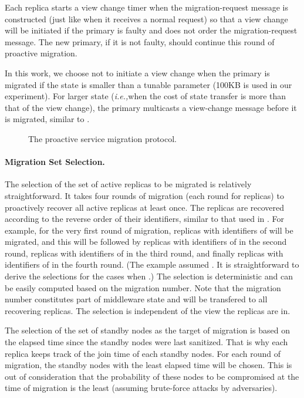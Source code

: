 \documentclass[times, 10pt, twocolumn]{article}
\newcommand{\ie}{{\it i.e.,}}
\begin{document}
Each replica starts a view change timer when the {\sc migration-request}
message is constructed (just like when it receives a normal request) so 
that a view change will be initiated if the primary is faulty and does not 
order the {\sc migration-request} message. The new primary, if it is
not faulty, should continue this round of proactive migration.

In this work, we choose not to initiate a view change when the primary
is migrated if the state is smaller than a tunable parameter (100KB
is used in our experiment). For larger state (\ie when the cost of state
transfer is more than that of the view change), the primary multicasts a 
{\sc view-change} message before it is migrated, similar to \cite{bft-acm}.

\begin{figure}[t]
\begin{center} 
\leavevmode
\epsfxsize=3.0in
\caption{The proactive service migration protocol.}
\label{migrationfig}
\end{center}
\end{figure}

\paragraph{Migration Set Selection.}
The selection of the set of active replicas to be migrated is relatively
straightforward.
It takes four rounds of migration (each round for  replicas) to 
proactively recover all active replicas at least once. The replicas
are recovered according to the reverse order of their identifiers, similar to
that used in \cite{bft-acm}. For example,
for the very first round of migration, replicas with identifiers
of  will be migrated, and this will be followed by replicas
with identifiers of  in the second round, replicas
with identifiers of  in the third round, and finally
replicas with identifiers of  in the fourth round. 
(The example assumed . It is straightforward to derive the selections
for the cases when .)
The selection is deterministic and can be easily computed
based on the migration number. Note that the migration number constitutes
part of middleware state and will be transfered to all recovering
replicas. The selection is independent of the view the
replicas are in.

The selection of the set of standby nodes as the target of migration
is based on the elapsed time since the standby nodes were last sanitized.
That is why each replica keeps track of the join time of each standby
nodes. For each round of migration, the  standby nodes
with the least elapsed time will be chosen. This is out of consideration
that the probability of these nodes to be compromised at the time of
migration is the least (assuming brute-force attacks by adversaries).
\end{document}
